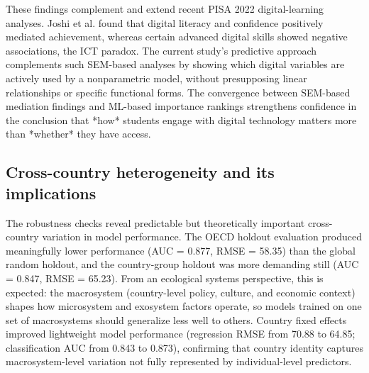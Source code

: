 \documentclass[pdflatex,sn-mathphys-ay]{sn-jnl}
\begin{document}
These findings complement and extend recent PISA 2022 digital-learning analyses. Joshi et al. \citep{Joshi_2025_digital_literacy} found that digital literacy and confidence positively mediated achievement, whereas certain advanced digital skills showed negative associations, the ICT paradox. The current study's predictive approach complements such SEM-based analyses by showing which digital variables are actively used by a nonparametric model, without presupposing linear relationships or specific functional forms. The convergence between SEM-based mediation findings and ML-based importance rankings strengthens confidence in the conclusion that *how* students engage with digital technology matters more than *whether* they have access.

\FloatBarrier
\subsection{Cross-country heterogeneity and its implications}

The robustness checks reveal predictable but theoretically important cross-country variation in model performance. The OECD holdout evaluation produced meaningfully lower performance (AUC = 0.877, RMSE = 58.35) than the global random holdout, and the country-group holdout was more demanding still (AUC = 0.847, RMSE = 65.23). From an ecological systems perspective, this is expected: the macrosystem (country-level policy, culture, and economic context) shapes how microsystem and exosystem factors operate, so models trained on one set of macrosystems should generalize less well to others. Country fixed effects improved lightweight model performance (regression RMSE from 70.88 to 64.85; classification AUC from 0.843 to 0.873), confirming that country identity captures macrosystem-level variation not fully represented by individual-level predictors.
\end{document}
